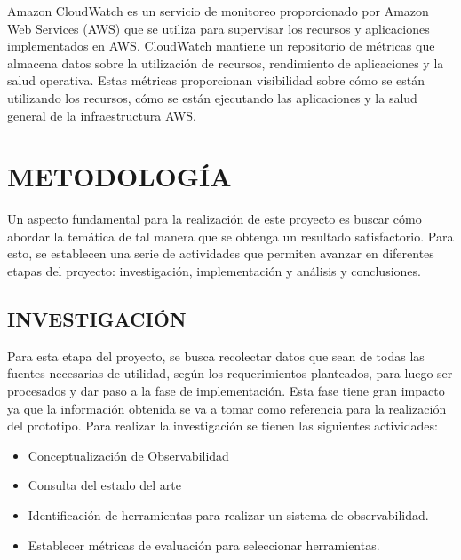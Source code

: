 \documentclass[a4paper,12pt]{article}
\begin{document}
Amazon CloudWatch es un servicio de monitoreo proporcionado por Amazon Web Services (AWS) que se utiliza para supervisar los recursos y aplicaciones implementados en AWS. CloudWatch mantiene un repositorio de métricas que almacena datos sobre la utilización de recursos, rendimiento de aplicaciones y la salud operativa. Estas métricas proporcionan visibilidad sobre cómo se están utilizando los recursos, cómo se están ejecutando las aplicaciones y la salud general de la infraestructura AWS.

\section{\large METODOLOGÍA}
Un aspecto fundamental para la realización de este proyecto es buscar cómo abordar la temática de tal manera que se obtenga un resultado satisfactorio. Para esto, se establecen una serie de actividades que permiten avanzar en diferentes etapas del proyecto: investigación, implementación y análisis y conclusiones.

\subsection{\normalsize INVESTIGACIÓN}
Para esta etapa del proyecto, se busca recolectar datos que sean de todas las fuentes necesarias de utilidad, según los requerimientos planteados, para luego ser procesados y dar paso a la fase de implementación. Esta fase tiene gran impacto ya que la información obtenida se va a tomar como referencia para la realización del prototipo. Para realizar la investigación se tienen las siguientes actividades:
\begin{itemize}
    \item Conceptualización de Observabilidad 
    \item Consulta del estado del arte
    \item Identificación de herramientas para realizar un sistema de observabilidad.
    \item Establecer métricas de evaluación para seleccionar herramientas.
\end{itemize}
\end{document}
